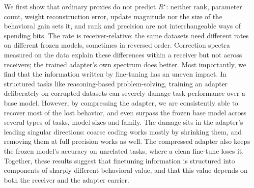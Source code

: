 \newline
We first show that ordinary proxies do not predict $R^\star$: neither rank, parameter count, weight reconstruction error, update magnitude nor the size of the behavioral gain sets it, and rank and precision are not interchangeable ways of spending bits. The rate is receiver-relative: the same datasets need different rates on different frozen models, sometimes in reversed order. Correction spectra measured on the data explain these differences within a receiver but not across receivers; the trained adapter's own spectrum does better.
\newline
Most importantly, we find that the information written by fine-tuning has an uneven impact. In structured tasks like reasoning-based problem-solving, training an adapter deliberately on corrupted datasets can severely damage task performance over a base model. However, by compressing the adapter, we are consistently able to recover most of the lost behavior, and even surpass the frozen base model across several types of tasks, model sizes and family. The damage sits in the adapter's leading singular directions: coarse coding works mostly by shrinking them, and removing them at full precision works as well. The compressed adapter also keeps the frozen model's accuracy on unrelated tasks, where a clean fine-tune loses it.
\newline
Together, these results suggest that finetuning information is structured into components of sharply different behavioral value, and that this value depends on both the receiver and the adapter carrier.

